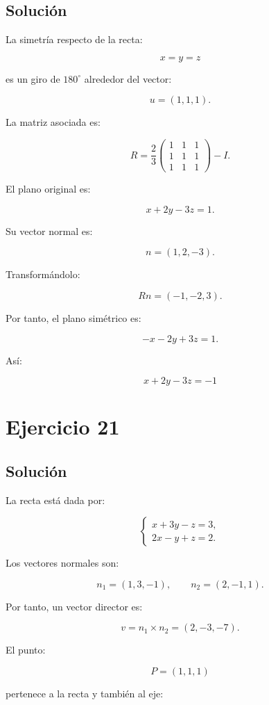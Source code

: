 \documentclass[11pt,a4paper]{article}
\begin{document}
\subsection{Solución}

La simetría respecto de la recta:

\[
x=y=z
\]

es un giro de \(180^\circ\) alrededor del vector:

\[
u=(1,1,1).
\]

La matriz asociada es:

\[
R
=
\frac23
\begin{pmatrix}
1&1&1\\
1&1&1\\
1&1&1
\end{pmatrix}
-
I.
\]

El plano original es:

\[
x+2y-3z=1.
\]

Su vector normal es:

\[
n=(1,2,-3).
\]

Transformándolo:

\[
Rn=(-1,-2,3).
\]

Por tanto, el plano simétrico es:

\[
-x-2y+3z=1.
\]

Así:

\[
\boxed{
x+2y-3z=-1
}
\]

\section{Ejercicio 21}
\subsection{Solución}

La recta está dada por:

\[
\begin{cases}
x+3y-z=3,\\
2x-y+z=2.
\end{cases}
\]

Los vectores normales son:

\[
n_1=(1,3,-1),
\qquad
n_2=(2,-1,1).
\]

Por tanto, un vector director es:

\[
v
=
n_1\times n_2
=
(2,-3,-7).
\]

El punto:

\[
P=(1,1,1)
\]

pertenece a la recta y también al eje:
\end{document}
